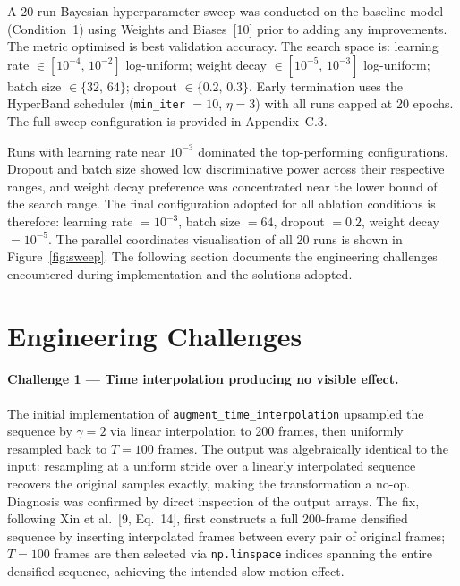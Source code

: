 A 20-run Bayesian hyperparameter sweep was conducted on the baseline model (Condition~1) using Weights and Biases~[10] prior to adding any improvements. The metric optimised is best validation accuracy. The search space is: learning rate $\in [10^{-4},\,10^{-2}]$ log-uniform; weight decay $\in [10^{-5},\,10^{-3}]$ log-uniform; batch size $\in \{32,\,64\}$; dropout $\in \{0.2,\,0.3\}$. Early termination uses the HyperBand scheduler (\texttt{min\_iter} $= 10$, $\eta = 3$) with all runs capped at 20 epochs. The full sweep configuration is provided in Appendix~C.3.

Runs with learning rate near $10^{-3}$ dominated the top-performing configurations. Dropout and batch size showed low discriminative power across their respective ranges, and weight decay preference was concentrated near the lower bound of the search range. The final configuration adopted for all ablation conditions is therefore: learning rate $= 10^{-3}$, batch size $= 64$, dropout $= 0.2$, weight decay $= 10^{-5}$. The parallel coordinates visualisation of all 20 runs is shown in Figure~\ref{fig:sweep}. The following section documents the engineering challenges encountered during implementation and the solutions adopted.

\section{Engineering Challenges}
\label{sec:challenges}

\paragraph{Challenge 1 --- Time interpolation producing no visible effect.}
The initial implementation of \texttt{augment\_time\_interpolation} upsampled the sequence by $\gamma = 2$ via linear interpolation to 200 frames, then uniformly resampled back to $T = 100$ frames. The output was algebraically identical to the input: resampling at a uniform stride over a linearly interpolated sequence recovers the original samples exactly, making the transformation a no-op. Diagnosis was confirmed by direct inspection of the output arrays. The fix, following Xin et al.~[9, Eq.~14], first constructs a full 200-frame densified sequence by inserting interpolated frames between every pair of original frames; $T = 100$ frames are then selected via \texttt{np.linspace} indices spanning the entire densified sequence, achieving the intended slow-motion effect.

